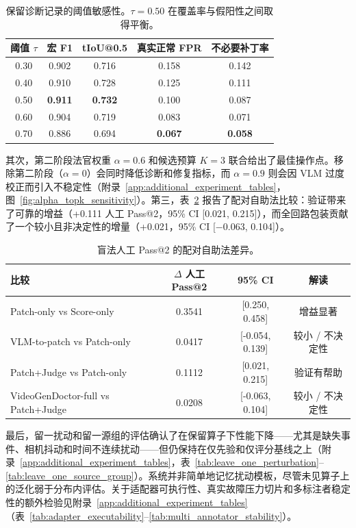 \documentclass{article}
\begin{document}
\begin{table}[t]
\centering\scriptsize
\caption{保留诊断记录的阈值敏感性。$\tau=0.50$ 在覆盖率与假阳性之间取得平衡。}
\label{tab:threshold_sensitivity}
\begin{tabular}{ccccc}
\toprule
阈值 $\tau$ & 宏 F1 & tIoU@0.5 & 真实正常 FPR & 不必要补丁率 \\
\midrule
0.30 & 0.902 & 0.716 & 0.158 & 0.142 \\
0.40 & 0.910 & 0.728 & 0.125 & 0.111 \\
0.50 & \textbf{0.911} & \textbf{0.732} & 0.100 & 0.087 \\
0.60 & 0.904 & 0.719 & 0.083 & 0.071 \\
0.70 & 0.886 & 0.694 & \textbf{0.067} & \textbf{0.058} \\
\bottomrule
\end{tabular}
\end{table}

其次，第二阶段法官权重 $\alpha=0.6$ 和候选预算 $K=3$ 联合给出了最佳操作点。移除第二阶段（$\alpha=0$）会同时降低诊断和修复指标，而 $\alpha=0.9$ 则会因 VLM 过度校正而引入不稳定性（附录~\ref{app:additional_experiment_tables}，图~\ref{fig:alpha_topk_sensitivity}）。第三，表~\ref{tab:paired_repair_test} 报告了配对自助法比较：验证带来了可靠的增益（+0.111 人工 Pass@2，95\% CI [0.021, 0.215]），而全回路包装贡献了一个较小且非决定性的增量（+0.021，95\% CI [$-$0.063, 0.104]）。

\begin{table}[t]
\centering\scriptsize
\caption{盲法人工 Pass@2 的配对自助法差异。}
\label{tab:paired_repair_test}
\begin{tabular}{lccc}
\toprule
比较 & $\Delta$ 人工 Pass@2 & 95\% CI & 解读 \\
\midrule
Patch-only vs Score-only & 0.3541 & [0.250, 0.458] & 增益显著 \\
VLM-to-patch vs Patch-only & 0.0417 & [-0.054, 0.139] & 较小 / 不决定性 \\
Patch+Judge vs Patch-only & 0.1112 & [0.021, 0.215] & 验证有帮助 \\
VideoGenDoctor-full vs Patch+Judge & 0.0208 & [-0.063, 0.104] & 较小 / 不决定性 \\
\bottomrule
\end{tabular}
\end{table}

最后，留一扰动和留一源组的评估确认了在保留算子下性能下降——尤其是缺失事件、相机抖动和时间不连续扰动——但仍保持在仅先验和仅评分基线之上（附录~\ref{app:additional_experiment_tables}，表~\ref{tab:leave_one_perturbation}--\ref{tab:leave_one_source_group}）。系统并非简单地记忆扰动模板，尽管未见算子上的泛化弱于分布内评估。关于适配器可执行性、真实故障压力切片和多标注者稳定性的额外检验见附录~\ref{app:additional_experiment_tables}（表~\ref{tab:adapter_executability}--\ref{tab:multi_annotator_stability}）。
\end{document}
